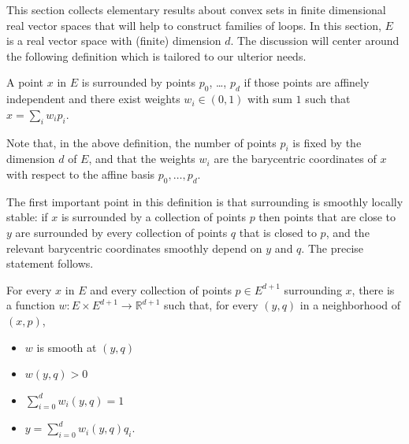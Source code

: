 \documentclass[10pt,a4paper]{article}
\newcommand{\co}{\!:}
\newcommand{\uses}[1]{}
\newcommand{\lean}[1]{}
\newcommand{\leanok}{}
\begin{document}
This section collects elementary results about convex sets in finite
dimensional real vector spaces that will help to construct families of loops.
In this section, $E$ is a real vector space with (finite) dimension $d$.
The discussion will center around the following definition which is tailored to
our ulterior needs.

\begin{definition}
  \label{def:surrounds_points}
  \lean{SurroundingPts}
  \leanok
  A point $x$ in $E$
  is surrounded by points $p_0$, \dots, $p_d$ if those points are
  affinely independent and there exist weights $w_i ∈ (0, 1)$ with sum $1$
  such that $x = \sum_i w_i p_i$.
\end{definition}

Note that, in the above definition, the number of points $p_i$ is fixed
by the dimension $d$ of $E$, and that the weights $w_i$ are the barycentric
coordinates of $x$ with respect to the affine basis $p_0, \ldots, p_d$.

The first important point in this definition is that surrounding is
smoothly locally stable: if $x$ is surrounded by a collection of points $p$
then points that are close to $y$ are surrounded by every collection of points
$q$ that is closed to $p$, and the relevant barycentric coordinates smoothly
depend on $y$ and $q$. The precise statement follows.

\begin{lemma}
  \label{lem:smooth_barycentric_coord}
  \uses{def:surrounds_points}
  \lean{smooth_surrounding}
  \leanok
  For every $x$ in $E$ and every collection of points $p ∈ E^{d+1}$
  surrounding $x$, there is a function $w \co E × E^{d+1} → ℝ^{d+1}$ such that,
  for every $(y, q)$ in a neighborhood of $(x, p)$,
  \begin{itemize}
    \item
      $w$ is smooth at $(y, q)$
    \item
      $w(y, q) > 0$
    \item
      $\sum_{i=0}^d w_i(y, q) = 1$
    \item
      $y = \sum_{i=0}^d w_i(y, q)q_i$.
  \end{itemize}
\end{lemma}
\end{document}

